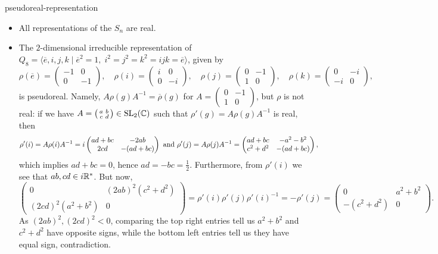 \begin{example}{pseudoreal-representation}
    \begin{itemize}
        \item All representations of the  $S_n$ are real.
        \item The $2$-dimensional irreducible representation of $Q_8 = \langle \overline{e}, i, j, k \mid \overline{e}^2 = 1, \; i^2 = j^2 = k^2 = ijk = \overline{e} \rangle$, given by
        \[ \rho(\overline{e}) = \begin{pmatrix} -1 & 0 \\ 0 & -1 \end{pmatrix}, \quad \rho(i) = \begin{pmatrix} i & 0 \\ 0 & -i \end{pmatrix}, \quad \rho(j) = \begin{pmatrix} 0 & -1 \\ 1 & 0 \end{pmatrix}, \quad \rho(k) = \begin{pmatrix} 0 & -i \\ -i & 0 \end{pmatrix} , \]
        is pseudoreal. Namely, $A \rho(g) A^{-1} = \overline{\rho}(g)$ for $A = \left(\begin{smallmatrix} 0 & -1 \\ 1 & 0 \end{smallmatrix}\right)$, but $\rho$ is not real: if we have $A = \left(\begin{smallmatrix} a & b \\ c & d \end{smallmatrix}\right) \in \textup{SL}_2(\mathbb{C})$ such that $\rho'(g) = A \rho(g) A^{-1}$ is real, then
        \[ \rho'(i) = A \rho(i) A^{-1} = i \begin{pmatrix} ad + bc & -2ab \\ 2cd & -(ad + bc) \end{pmatrix} \textup{ and } \rho'(j) = A \rho(j) A^{-1} = \begin{pmatrix} ad + bc & -a^2 - b^2 \\ c^2 + d^2 & -(ad + bc) \end{pmatrix} , \]
        which implies $ad + bc = 0$, hence $ad = -bc = \tfrac{1}{2}$. Furthermore, from $\rho'(i)$ we see that $ab, cd \in i \mathbb{R}^*$. But now,
        \[ \begin{pmatrix} 0 & (2ab)^2 (c^2 + d^2) \\ (2cd)^2 (a^2 + b^2) & 0 \end{pmatrix} = \rho'(i) \rho'(j) \rho'(i)^{-1} = - \rho'(j) = \begin{pmatrix} 0 & a^2 + b^2 \\ -(c^2 + d^2) & 0 \end{pmatrix} . \]
        As $(2ab)^2, (2cd)^2 < 0$, comparing the top right entries tell us $a^2 + b^2$ and $c^2 + d^2$ have opposite signs, while the bottom left entries tell us they have equal sign, contradiction.
    \end{itemize}
\end{example}

